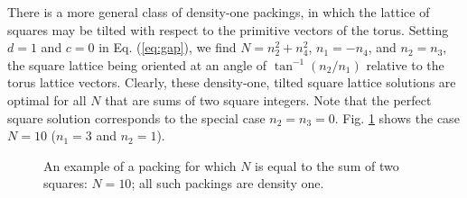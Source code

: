 \documentclass{umthesis}          %
\begin{document}
There is a more general class of density-one packings, in which the lattice of squares may be tilted with respect to the primitive vectors of the torus. Setting $d=1$ and $c=0$ in Eq. (\ref{eq:gap}), we find $N=n_2^2 + n_4^2$, $n_1=-n_4$, and $n_2 = n_3$, the square lattice being oriented at an angle of $\tan^{-1}(n_2/n_1)$ relative to the torus lattice vectors.   Clearly, these density-one, tilted square lattice solutions are optimal for all $N$ that are sums of two square integers.  Note that the perfect square solution corresponds to the special case $n_2 = n_3 = 0$.  Fig. \ref{fig:bravais} shows the case $N=10$ ($n_1=3$ and $n_2=1$).

\begin{figure}[H]
\caption{\label{fig:bravais} An example of a packing for which $N$ is equal to the sum of two squares: $N=10$; all such packings are density one.}
\end{figure}
\end{document}

